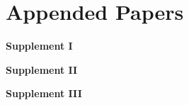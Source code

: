 

\newcommand{\addPaper}[2]{%
\medskip{}
\noindent \begin{minipage}[t]{0.25\textwidth}%
\textbf{#1}%
\end{minipage}%
\begin{minipage}[t]{0.75\textwidth}%
#2%
\end{minipage}

\vspace{8mm}
}


\chapter*{Appended Papers}


\addPaper
{Supplement I}
{}

\addPaper
{Supplement II}
{}

\addPaper
{Supplement III}
{}
